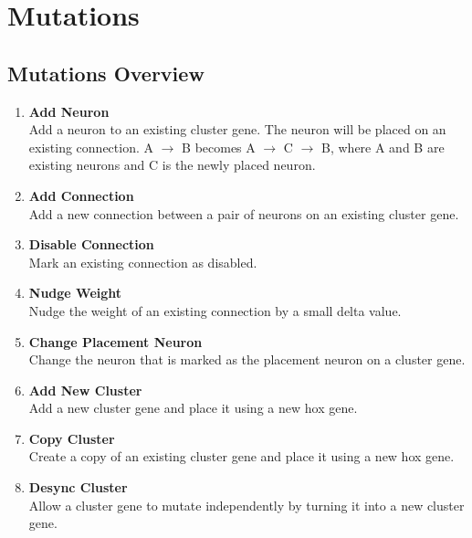 \newpage
\section{Mutations}

\subsection{Mutations Overview}

\begin{enumerate}\itemsep0pt
    \item \textbf{Add Neuron} \\
    Add a neuron to an existing cluster gene. The neuron will be placed on an existing connection.  
    A $\rightarrow$ B becomes A $\rightarrow$ C $\rightarrow$ B, where A and B are existing neurons and C is the newly placed neuron.
    
    \item \textbf{Add Connection} \\
    Add a new connection between a pair of neurons on an existing cluster gene.
    
    \item \textbf{Disable Connection} \\    
    Mark an existing connection as disabled.
    
    \item \textbf{Nudge Weight} \\    
    Nudge the weight of an existing connection by a small delta value.
    
    \item \textbf{Change Placement Neuron} \\    
    Change the neuron that is marked as the placement neuron on a cluster gene.
    
    \item \textbf{Add New Cluster} \\    
    Add a new cluster gene and place it using a new hox gene.
    
    \item \textbf{Copy Cluster} \\    
    Create a copy of an existing cluster gene and place it using a new hox gene.
    
    \item \textbf{Desync Cluster} \\    
    Allow a cluster gene to mutate independently by turning it into a new cluster gene.
    

\end{enumerate}

